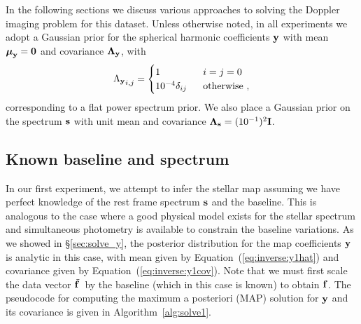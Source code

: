 \documentclass[modern]{aastex631}
\begin{document}
%

In the following sections we discuss various approaches to solving the Doppler imaging problem for this dataset.
Unless otherwise noted, in all experiments we adopt a Gaussian prior for the spherical harmonic coefficients ${\mathbf{y}}$ with mean $\boldsymbol{\mu}_{\mathbf{y}} = {\mathbf{0}}$ and covariance $\boldsymbol{\Lambda}_{\mathbf{y}}$, with
%
\begin{align}
    \label{eq:Lambday}
    {\Lambda_\bvec{y}}_{i, j} 
    =
    \begin{cases}
        1 & \quad\quad\quad\quad i = j = 0
        \\
        10^{-4}\delta_{ij} & \quad\quad\quad\quad \mathrm{otherwise}
        \quad,
    \end{cases}
\end{align}
%
corresponding to a flat power spectrum prior.
We also place a Gaussian prior on the spectrum ${\mathbf{s}}$ with unit mean and covariance $\boldsymbol{\Lambda}_{\mathbf{s}} = (10^{-1})^2{\mathbf{I}}$.

\subsection{Known baseline and spectrum}
\label{sec:spot_y1}
%
In our first experiment, we attempt to infer the stellar map assuming we have perfect knowledge of the rest frame spectrum ${\mathbf{s}}$ and the baseline.
This is analogous to the case where a good physical model exists for the stellar spectrum and simultaneous photometry is available to constrain the baseline variations.
As we showed in \S\ref{sec:solve_y}, the posterior distribution for the map coefficients ${\mathbf{y}}$ is analytic in this case, with mean given by Equation~(\ref{eq:inverse:y1hat})
and covariance given by Equation~(\ref{eq:inverse:y1cov}). 
Note that we must first scale the data vector $\tilde{{\mathbf{f}}\hspace{0.2em}}$ by the baseline (which in this case is known) to obtain ${\mathbf{f}}$.
The pseudocode for computing the maximum a posteriori (MAP) solution for ${\mathbf{y}}$ and its covariance is given in Algorithm~\ref{alg:solve1}.
\end{document}
